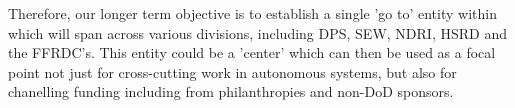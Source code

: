 \documentclass[11pt,letterpaper]{article}
\begin{document}
Therefore, our longer term objective is to establish a single 'go to' entity within \org
which will span across various divisions, including DPS, SEW, NDRI,
HSRD and the FFRDC's. This entity could be a 'center' which can then
be used as a focal point not just for cross-cutting work in autonomous
systems, but also for chanelling funding including from philanthropies
and non-DoD sponsors.
\end{document}
